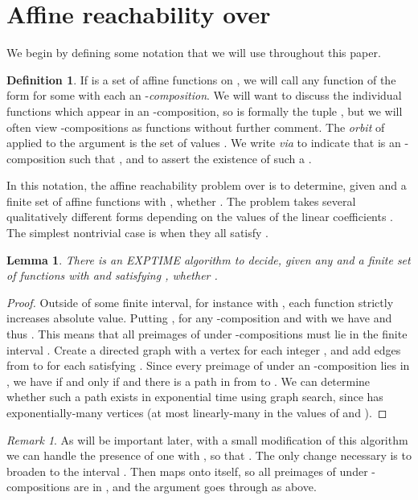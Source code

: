\documentclass[11pt]{amsart}
\newtheorem{lemma}{Lemma}
\theoremstyle{definition}
\newtheorem*{definition}{Definition}
\theoremstyle{remark}
\newtheorem*{remark}{Remark}
\begin{document}
\section{Affine reachability over } \label{reach-z}

We begin by defining some notation that we will use throughout this paper.
\begin{definition}
If  is a set of affine functions on , we will call any function of the form  for some  with each  an -\emph{composition}. We will want to discuss the individual functions  which appear in an -composition, so  is formally the tuple , but we will often view -compositions as functions without further comment. The \emph{orbit} of  applied to the argument  is the set of values . We write  \emph{via}  to indicate that  is an -composition such that , and  to assert the existence of such a .
\end{definition}
In this notation, the affine reachability problem over  is to determine, given  and a finite set  of affine functions  with , whether . The problem takes several qualitatively different forms depending on the values of the linear coefficients . The simplest nontrivial case is when they all satisfy . 

\begin{lemma} \label{expanding-reachable}
There is an \textsf{EXPTIME} algorithm to decide, given any  and a finite set  of functions  with  and satisfying , whether .
\end{lemma}
\begin{proof}
Outside of some finite interval, for instance  with , each function  strictly increases absolute value. Putting , for any -composition  and  with  we have  and thus . This means that all preimages of  under -compositions must lie in the finite interval . Create a directed graph  with a vertex for each integer , and add edges from  to  for each  satisfying . Since every preimage of  under an -composition lies in , we have  if and only if  and there is a path in  from  to . We can determine whether such a path exists in exponential time using graph search, since  has exponentially-many vertices (at most linearly-many in the values of  and ).
\end{proof}
\begin{remark}
As will be important later, with a small modification of this algorithm we can handle the presence of one  with , so that . The only change necessary is to broaden  to the interval . Then  maps  onto itself, so all preimages of  under -compositions are in , and the argument goes through as above.
\end{remark}
\end{document}
